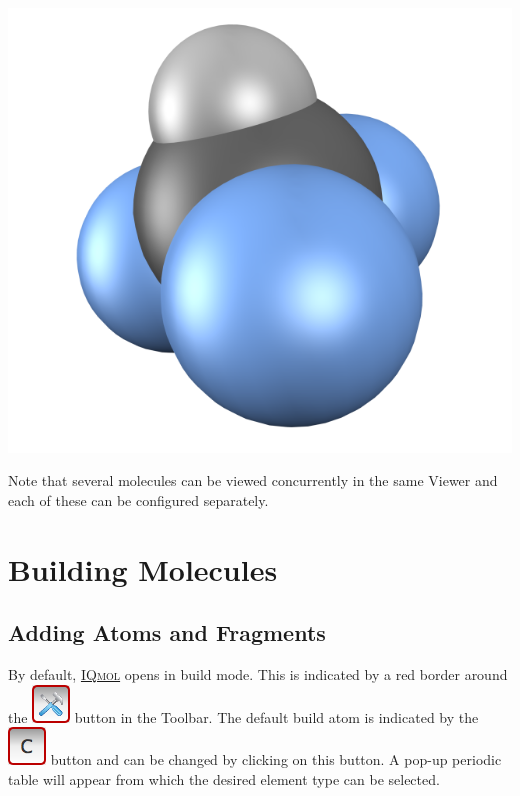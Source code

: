 \documentclass[a4paper,12pt]{article}
\newcommand{\iqmol}{\href{http://iqmol.org}{{\scshape IQmol}}}
\begin{document}
\begin{center}
\includegraphics[scale=0.25]{figures/CHF3-space.png}
\end{center}
Note that several molecules can be viewed concurrently in the same Viewer
and each of these can be configured separately.  





\newpage
\section{Building Molecules}


\subsection{Adding Atoms and Fragments}

By default, \iqmol{} opens in build mode.  This is indicated by a red border
around the \includegraphics[scale=0.40]{figures/BuildButton.png} button in the
Toolbar.   The default build atom is indicated by the
\includegraphics[scale=0.40]{figures/BuildAtomButton.png} button and can be changed
by clicking on this button.  A pop-up periodic table will appear from which the
desired element type can be selected. \\
\end{document}
